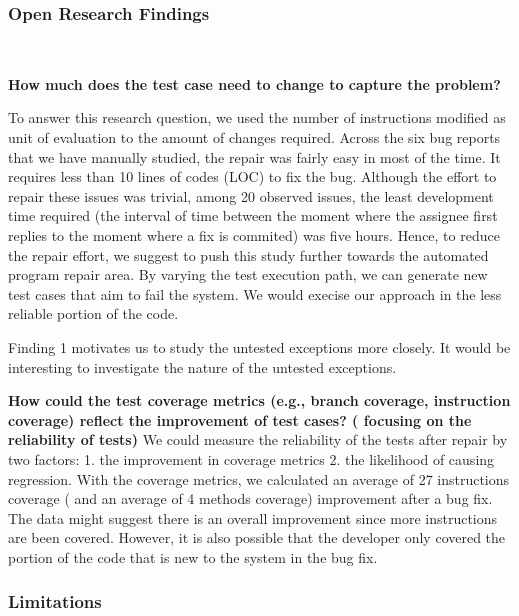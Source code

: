 	\subsubsection{Open Research Findings}~

		\textbf{How much does the test case need to change to capture the problem?} 
		
		To answer this research question, we used the number of instructions modified as unit of evaluation to the amount of changes required. Across the six bug reports that we have manually studied, the repair was fairly easy in most of the time. It requires less than 10 lines of codes (LOC) to fix the bug. Although the effort to repair these issues was trivial, among 20 observed issues, the least development time required (the interval of time between the moment where the assignee first replies to the moment where a fix is commited) was five hours. Hence, to reduce the repair effort, we suggest to push this study further towards the automated program repair area. By varying the test execution path, we can generate new test cases that aim to fail the system. We would execise our approach in the less reliable portion of the code.

		Finding 1 motivates us to study the untested exceptions more closely. It would be interesting to investigate the nature of the untested exceptions. 

		
		\textbf{How could the test coverage metrics (e.g., branch coverage, instruction coverage) reflect the improvement of test cases? ( focusing on the reliability of tests)} We could measure the reliability of the tests after repair by two factors: 1. the improvement in coverage metrics 2. the likelihood of causing regression. With the coverage metrics, we calculated an average of 27 instructions coverage ( and an average of 4 methods coverage) improvement after a bug fix. The data might suggest there is an overall improvement since more instructions are been covered. However, it is also possible that the developer only covered the portion of the code that is new to the system in the bug fix. 
    ~\\
	
	\subsubsection{Limitations}~

